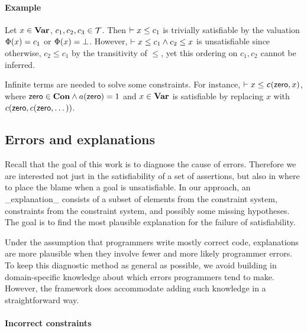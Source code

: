 \paragraph{Example}

Let $x\in \mathbf{Var}$, $c_1, c_2, c_3\in \mathcal{T}$. Then $\vdash x \leq c_1$ is
trivially satisfiable by the valuation $\Phi(x)=c_1$ or
$\Phi(x)=\bot$. However, $\vdash x \leq c_1 \land c_2 \leq x$ is
unsatisfiable since otherwise, $c_2 \leq c_1$ by the transitivity of
$\leq$, yet this ordering on $c_1, c_2$ cannot be inferred.

Infinite terms are needed to solve some constraints. For instance,
$\vdash x \leq \textsf{\textit{c}}(\textsf{zero}, x)$, where $\textsf{zero}
\in \mathbf{Con} \land a(\textsf{zero})=1$ and $x\in \mathbf{Var}$ is satisfiable
by replacing $x$ with $c(\textsf{zero}, c(\textsf{zero}, \dots))$.


\subsection{Errors and explanations}

Recall that the goal of this work is to diagnose the cause of errors.
Therefore we are interested not just in the satisfiability of a
set of assertions, but also in where to place the blame when
a goal is unsatisfiable. In our approach,
an _explanation_ consists of a subset of elements from the constraint
system, constraints from the constraint system, and possibly some
missing hypotheses. The goal is to find the most plausible
explanation for the failure of satisfiability. 

Under the assumption that programmers write mostly correct code,
explanations are more plausible when they involve fewer and more
likely programmer errors. To keep this diagnostic method as general as
possible, we avoid building in domain-specific knowledge about which
errors programmers tend to make.  However, the framework does
accommodate adding such knowledge in a straightforward way.


\paragraph{Incorrect constraints}

